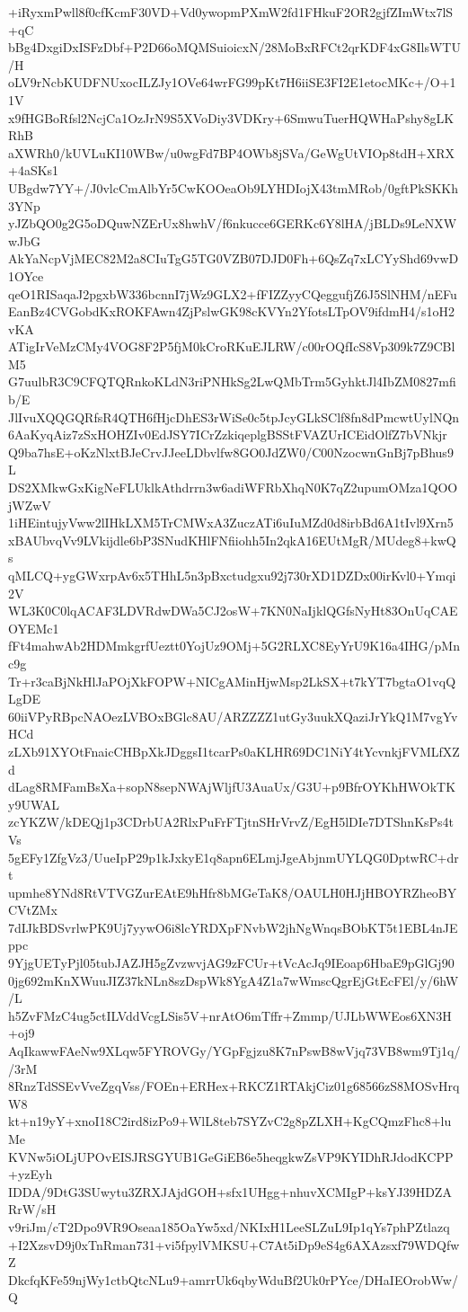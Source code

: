 +iRyxmPwll8f0cfKcmF30VD+Vd0ywopmPXmW2fd1FHkuF2OR2gjfZImWtx7lS+qC
bBg4DxgiDxISFzDbf+P2D66oMQMSuioicxN/28MoBxRFCt2qrKDF4xG8IlsWTU/H
oLV9rNcbKUDFNUxocILZJy1OVe64wrFG99pKt7H6iiSE3FI2E1etocMKc+/O+11V
x9fHGBoRfsl2NcjCa1OzJrN9S5XVoDiy3VDKry+6SmwuTuerHQWHaPshy8gLKRhB
aXWRh0/kUVLuKI10WBw/u0wgFd7BP4OWb8jSVa/GeWgUtVIOp8tdH+XRX+4aSKs1
UBgdw7YY+/J0vlcCmAlbYr5CwKOOeaOb9LYHDIojX43tmMRob/0gftPkSKKh3YNp
yJZbQO0g2G5oDQuwNZErUx8hwhV/f6nkucce6GERKc6Y8lHA/jBLDs9LeNXWwJbG
AkYaNcpVjMEC82M2a8CIuTgG5TG0VZB07DJD0Fh+6QsZq7xLCYyShd69vwD1OYce
qeO1RISaqaJ2pgxbW336bcnnI7jWz9GLX2+fFIZZyyCQeggufjZ6J5SlNHM/nEFu
EanBz4CVGobdKxROKFAwn4ZjPslwGK98cKVYn2YfotsLTpOV9ifdmH4/s1oH2vKA
ATigIrVeMzCMy4VOG8F2P5fjM0kCroRKuEJLRW/c00rOQfIcS8Vp309k7Z9CBlM5
G7uulbR3C9CFQTQRnkoKLdN3riPNHkSg2LwQMbTrm5GyhktJl4IbZM0827mfib/E
JlIvuXQQGQRfsR4QTH6fHjcDhES3rWiSe0c5tpJcyGLkSClf8fn8dPmcwtUylNQn
6AaKyqAiz7zSxHOHZIv0EdJSY7ICrZzkiqeplgBSStFVAZUrICEidOlfZ7bVNkjr
Q9ba7hsE+oKzNlxtBJeCrvJJeeLDbvlfw8GO0JdZW0/C00NzocwnGnBj7pBhus9L
DS2XMkwGxKigNeFLUklkAthdrrn3w6adiWFRbXhqN0K7qZ2upumOMza1QOOjWZwV
1iHEintujyVww2lIHkLXM5TrCMWxA3ZuczATi6uIuMZd0d8irbBd6A1tIvl9Xrn5
xBAUbvqVv9LVkijdle6bP3SNudKHlFNfiiohh5In2qkA16EUtMgR/MUdeg8+kwQs
qMLCQ+ygGWxrpAv6x5THhL5n3pBxctudgxu92j730rXD1DZDx00irKvl0+Ymqi2V
WL3K0C0lqACAF3LDVRdwDWa5CJ2osW+7KN0NaIjklQGfsNyHt83OnUqCAEOYEMc1
fFt4mahwAb2HDMmkgrfUeztt0YojUz9OMj+5G2RLXC8EyYrU9K16a4IHG/pMnc9g
Tr+r3caBjNkHlJaPOjXkFOPW+NICgAMinHjwMsp2LkSX+t7kYT7bgtaO1vqQLgDE
60iiVPyRBpcNAOezLVBOxBGlc8AU/ARZZZZ1utGy3uukXQaziJrYkQ1M7vgYvHCd
zLXb91XYOtFnaicCHBpXkJDggsI1tcarPs0aKLHR69DC1NiY4tYcvnkjFVMLfXZd
dLag8RMFamBsXa+sopN8sepNWAjWljfU3AuaUx/G3U+p9BfrOYKhHWOkTKy9UWAL
zcYKZW/kDEQj1p3CDrbUA2RlxPuFrFTjtnSHrVrvZ/EgH5lDIe7DTShnKsPs4tVs
5gEFy1ZfgVz3/UueIpP29p1kJxkyE1q8apn6ELmjJgeAbjnmUYLQG0DptwRC+drt
upmhe8YNd8RtVTVGZurEAtE9hHfr8bMGeTaK8/OAULH0HJjHBOYRZheoBYCVtZMx
7dIJkBDSvrlwPK9Uj7yywO6i8lcYRDXpFNvbW2jhNgWnqsBObKT5t1EBL4nJEppc
9YjgUETyPjl05tubJAZJH5gZvzwvjAG9zFCUr+tVcAcJq9IEoap6HbaE9pGlGj90
0jg692mKnXWuuJIZ37kNLn8szDspWk8YgA4Z1a7wWmscQgrEjGtEcFEl/y/6hW/L
h5ZvFMzC4ug5ctILVddVcgLSis5V+nrAtO6mTffr+Zmmp/UJLbWWEos6XN3H+oj9
AqIkawwFAeNw9XLqw5FYROVGy/YGpFgjzu8K7nPswB8wVjq73VB8wm9Tj1q//3rM
8RnzTdSSEvVveZgqVss/FOEn+ERHex+RKCZ1RTAkjCiz01g68566zS8MOSvHrqW8
kt+n19yY+xnoI18C2ird8izPo9+WlL8teb7SYZvC2g8pZLXH+KgCQmzFhc8+luMe
KVNw5iOLjUPOvEISJRSGYUB1GeGiEB6e5heqgkwZsVP9KYIDhRJdodKCPP+yzEyh
IDDA/9DtG3SUwytu3ZRXJAjdGOH+sfx1UHgg+nhuvXCMIgP+ksYJ39HDZARrW/sH
v9riJm/cT2Dpo9VR9Oseaa185OaYw5xd/NKIxH1LeeSLZuL9Ip1qYs7phPZtlazq
+I2XzsvD9j0xTnRman731+vi5fpylVMKSU+C7At5iDp9eS4g6AXAzsxf79WDQfwZ
DkcfqKFe59njWy1ctbQtcNLu9+amrrUk6qbyWduBf2Uk0rPYce/DHaIEOrobWw/Q
